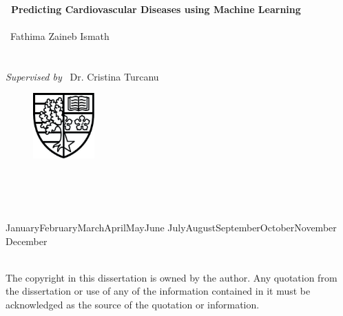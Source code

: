 \begin{titlepage}

\begin{center}
	
	~\\[0.2cm]
	{\huge \textbf{\ Predicting Cardiovascular Diseases using Machine Learning}}\\
	~\\[0.5cm]
	
	{\huge \ Fathima Zaineb Ismath}\\[1cm]
	{\Large \docAuthorDegree}\\[0.2cm]
	{\Large \docType}\\[1cm]
	{\large \textit{Supervised by} {\Large \ Dr. Cristina Turcanu}}
	~\\[1cm]
	
    \begin{figure}[h]
        \centering
        \includegraphics[height=2.5cm,keepaspectratio]{setup/hwcoa_bw.jpg}
	\end{figure}
	\begin{large}
		\textsc{\docInstitution}\\
		\docSchool\\
	\end{large}
	~\\[0.7cm]
	
	{\Large \ifcase\the\month\or
  January\or February\or March\or April\or May\or June\or
  July\or August\or September\or October\or November\or
  December\fi~\the\year}\\
	~\\[0.7cm]
	
	\begin{minipage}{0.7\textwidth}
	\begin{footnotesize}
	The copyright in this dissertation is owned by the author. Any quotation from the dissertation or use of any of the information contained in it must be acknowledged as the source of the quotation or information.
	\end{footnotesize}
	\end{minipage}
	
\end{center}

\end{titlepage}
\newpage
\thispagestyle{empty}
\hfill
\clearpage